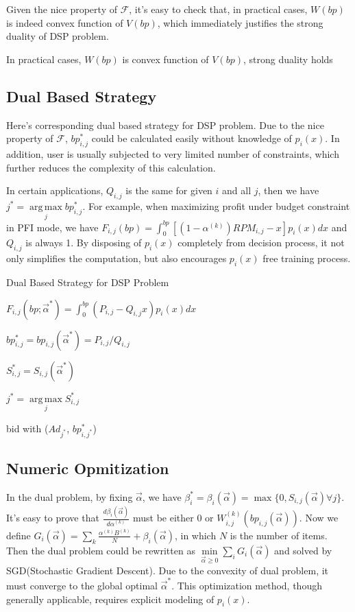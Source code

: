 \documentclass[sigconf]{acmart}
\DeclareMathOperator*{\argmax}{arg\,max}
\newcommand{\sbp}{bp_{i,j}}
\newcommand{\sW}{W_{i,j}^{(k)}}
\newcommand{\sB}{B^{(k)}}
\newcommand{\sRPM}{RPM_{i,j}}
\newcommand{\salpha}{\alpha^{(k)}}
\newcommand{\sbeta}{\beta_i}
\newcommand{\sF}{F_{i,j}}
\newcommand{\sS}{S_{i,j}}
\newcommand{\sG}{G_i}
\newcommand{\valpha}{\vec{\alpha}}
\newcommand{\uff}{\mathscr{F}}
\begin{document}
Given the nice property of $\uff$, it's easy to check that, in practical cases, $W(bp)$ is indeed convex function of $V(bp)$,
    which immediately justifies the strong duality of DSP problem.

\begin{theorem}
In practical cases, $W(bp)$ is convex function of $V(bp)$, strong duality holds
\end{theorem}

\subsection{Dual Based Strategy}

Here's corresponding dual based strategy for DSP problem.
Due to the nice property of $\uff$, $\sbp^*$ could be calculated easily without knowledge of $p_i(x)$.
In addition, user is usually subjected to very limited number of constraints, which further reduces the complexity of this calculation.

In certain applications, $Q_{i,j}$ is the same for given $i$ and all $j$, then we have $j^* = \argmax\limits_j \sbp^*$.
For example, when maximizing profit under budget constraint in PFI mode,
    we have $\sF(bp) = \int_0^{bp} [(1-\salpha)\sRPM-x]p_i(x)dx$ and $Q_{i,j}$ is always 1.
By disposing of $p_i(x)$ completely from decision process, it not only simplifies the computation,
    but also encourages $p_i(x)$ free training process.

\begin{algorithm}
\caption{Dual Based Strategy for DSP Problem}

{
  {
    $\sF(bp; \valpha^*) = \int_0^{bp} (P_{i,j}-Q_{i,j}x)p_i(x)dx$

    $\sbp^* = \sbp(\valpha^*) = P_{i,j}/Q_{i,j}$

    $\sS^* = \sS(\valpha^*)$
  }
  $j^* = \argmax\limits_j \sS^*$
  
   { bid with ($Ad_{j^*}$, $bp_{i,j^*}^*$) }
}
\end{algorithm}

\subsection{Numeric Opmitization}

In the dual problem, by fixing $\valpha$, we have $\sbeta^* = \sbeta(\valpha) = \max \{ 0, \sS(\valpha) \forall j \}$.
It's easy to prove that $\frac{d\sbeta(\valpha)}{d\salpha}$ must be either $0$ or $\sW(\sbp(\valpha))$.
Now we define $\sG(\valpha) = \sum\limits_k \frac{\salpha \sB}{N} + \sbeta(\valpha)$, in which $N$ is the number of items.
Then the dual problem could be rewritten as $\min\limits_{\valpha \ge 0} \sum\limits_i \sG(\valpha)$
    and solved by SGD(Stochastic Gradient Descent).
Due to the convexity of dual problem, it must converge to the global optimal $\valpha^*$.
This optimization method, though generally applicable, requires explicit modeling of $p_i(x)$.
\end{document}
